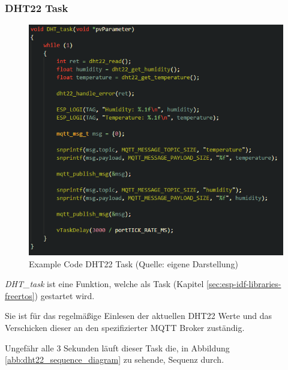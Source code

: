 \subsubsection{DHT22 Task}

\begin{figure}[H]
    \begin{center}
        \includegraphics[scale=0.8]{images/example_code_dht22_task.png}
        \caption{Example Code DHT22 Task (Quelle: eigene Darstellung)}
        \label{abb:example_code_dht22_task}
    \end{center}
\end{figure}

\textit{DHT\_task} ist eine Funktion, welche als Task (Kapitel \ref{sec:esp-idf-libraries-freertos}) gestartet wird. 

Sie ist für das regelmäßige Einlesen der aktuellen DHT22 Werte und das Verschicken dieser an den spezifizierter MQTT Broker zuständig.

Ungefähr alle 3 Sekunden läuft dieser Task die, in Abbildung \ref{abb:dht22_sequence_diagram} zu sehende, Sequenz durch.

